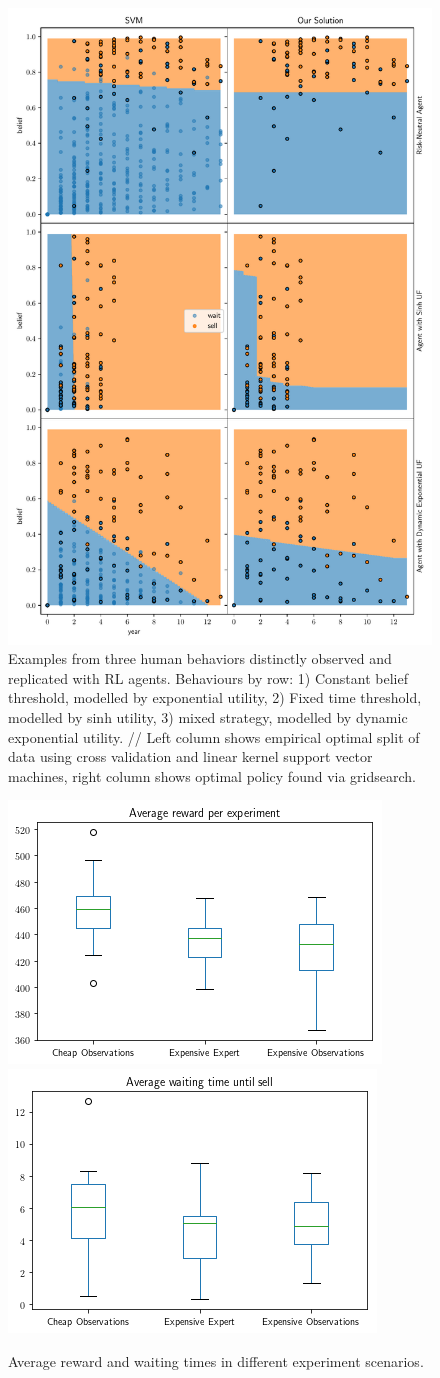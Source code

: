 
\begin{figure}
    \includegraphics[width=0.8\linewidth]{img/fit}
    \caption{Examples from three human behaviors distinctly observed and replicated with RL agents. Behaviours by row: 1) Constant belief threshold, modelled by exponential utility, 2) Fixed time threshold, modelled by sinh utility, 3) mixed strategy, modelled by dynamic exponential utility. // Left column shows empirical optimal split of data using cross validation and linear kernel support vector machines, right column shows optimal policy found via gridsearch.}
\end{figure}


\begin{figure}
\includegraphics[width=0.4\linewidth]{img/avg_reward.png}
\includegraphics[width=0.4\linewidth]{img/avg_waiting.png}
\caption{Average reward and waiting times in different experiment scenarios.}
\end{figure}
